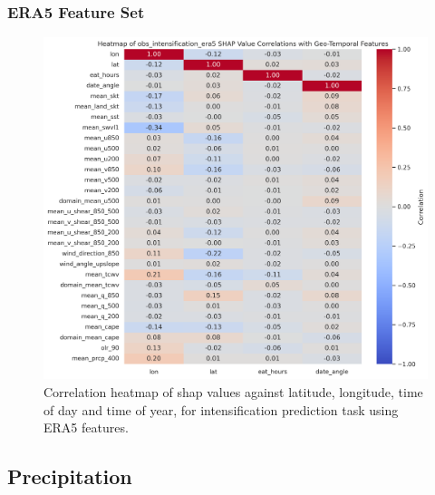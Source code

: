 \subsubsection{ERA5 Feature Set}
\begin{figure}[ht]
    \centering
    \includegraphics[width=\textwidth]{../figures/generated/experiments/obs_intensification/obs_intensification_era5_shap_correlation_heatmap.png}
    \caption{Correlation heatmap of \acrshort{shap} values against latitude, longitude, time of day and time of year, for intensification prediction task using ERA5 features.}
    \label{fig:obs_intensification_era5_shap_heatmap}
\end{figure}

\subsection{Precipitation}
\label{appn:shap-heatmaps-precip}

